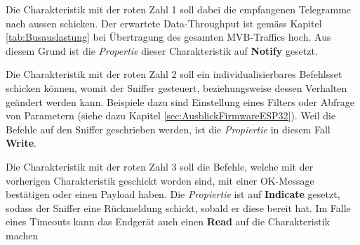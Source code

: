 Die Charakteristik mit der roten Zahl 1 soll dabei die empfangenen Telegramme nach aussen schicken. Der erwartete Data-Throughput ist gemäss Kapitel \ref{tab:Busauslastung} bei Übertragung des gesamten MVB-Traffics hoch. Aus diesem Grund ist die \textit{Propertie} dieser Charakteristik auf \textbf{Notify} gesetzt.

Die Charakteristik mit der roten Zahl 2 soll ein individualisierbares Befehlsset schicken können, womit der Sniffer gesteuert, beziehungsweise dessen Verhalten geändert werden kann. Beispiele dazu sind Einstellung eines Filters oder Abfrage von Parametern (siehe dazu Kapitel \ref{sec:AusblickFirmwareESP32}). Weil die Befehle auf den Sniffer geschrieben werden, ist die \textit{Propiertie} in diesem Fall \textbf{Write}.

Die Charakteristik mit der roten Zahl 3 soll die Befehle, welche mit der vorherigen Charakteristik geschickt worden sind, mit einer OK-Message bestätigen oder einen Payload haben. Die \textit{Propiertie} ist auf \textbf{Indicate} gesetzt, sodass der Sniffer eine Rückmeldung schickt, sobald er diese bereit hat. Im Falle eines Timeouts kann das Endgerät auch einen \textbf{Read} auf die Charakteristik machen

